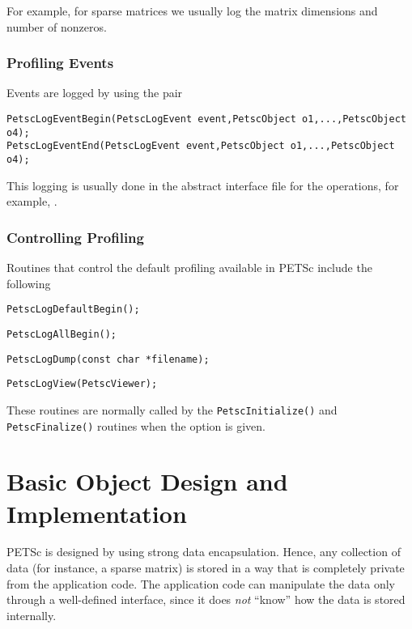 For example, for sparse matrices we usually log the matrix
dimensions and number of nonzeros.

\subsection{Profiling Events}

Events are logged by using the
pair
\begin{lstlisting}
PetscLogEventBegin(PetscLogEvent event,PetscObject o1,...,PetscObject o4);
PetscLogEventEnd(PetscLogEvent event,PetscObject o1,...,PetscObject o4);
\end{lstlisting}
This logging is usually done in the abstract
interface file for the operations, for example, \href{https://www.mcs.anl.gov/petsc/petsc-master/src/mat/interface/matrix.c.html}{}.

\subsection{Controlling Profiling}

Routines that control the default profiling available in PETSc include the following
\begin{tightitemize}
  \item\lstinline{PetscLogDefaultBegin();}
  \item\lstinline{PetscLogAllBegin();}
  \item\lstinline{PetscLogDump(const char *filename);}
  \item\lstinline{PetscLogView(PetscViewer);}
\end{tightitemize}
These routines are normally called by the \lstinline{PetscInitialize()}
and \lstinline{PetscFinalize()} routines when the option
 is given.

\chapter{Basic Object Design and Implementation}
\label{chapter:design}

PETSc is designed by using strong data encapsulation.  Hence,
any collection of data (for instance, a sparse matrix) is stored in
a way that is completely private from the application code. The application
code can manipulate the data only through a well-defined interface, since it
does {\em not} ``know'' how the data is stored internally.

